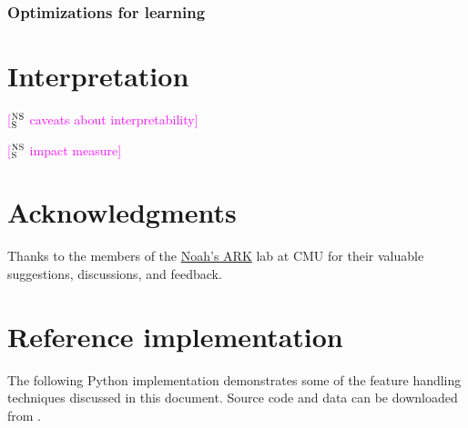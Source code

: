 \documentclass[11pt,letterpaper]{article}
\newcommand{\ensuretext}[1]{#1}
\newcommand{\nssmarker}{\ensuretext{\textcolor{magenta}{\ensuremath{^{\textsc{NS}}_{\textsc{S}}}}}}
\newcommand{\arkcomment}[3]{\ensuretext{\textcolor{#3}{[#1 #2]}}}
\newcommand{\nss}[1]{\arkcomment{\nssmarker}{#1}{magenta}}
\begin{document}
\subsubsection{Optimizations for learning}


\section{Interpretation}\label{sec:interp}

\nss{caveats about interpretability}

\nss{impact measure}

\section*{Acknowledgments}

Thanks to the members of the \href{http://www.ark.cs.cmu.edu/}{Noah's ARK} lab at CMU 
for their valuable suggestions, discussions, and feedback.

\appendix
\section{Reference implementation}\label{ex}

The following Python implementation demonstrates some of the feature handling techniques discussed in this document.
Source code and data can be downloaded from .





\end{document}

